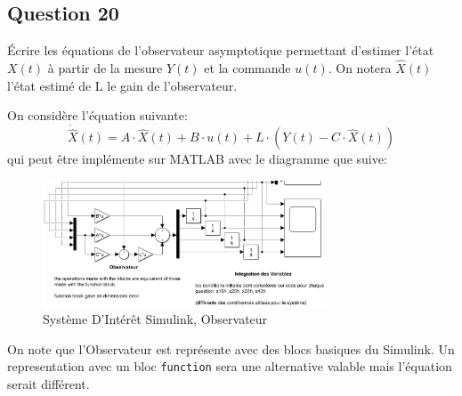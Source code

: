 \documentclass[class=article, crop=false]{standalone}
\begin{document}
\newpage
\subsection{Question 20}
\begin{exercise}
    Écrire les équations de l'observateur asymptotique permettant d'estimer l'état $X(t)$ à partir de la mesure $Y(t)$ et la commande $u(t)$. On notera $\hat{X}(t)$ l'état estimé de L le gain de l'observateur.
\end{exercise}
\begin{resolution}
    On considère l'équation suivante:
    \begin{equation}
        \dot{\hat{X}}(t) = A \cdot \hat{X}(t) + B \cdot u(t) + L \cdot (Y(t) - C \cdot \hat{X}(t))
    \end{equation}
    qui peut être implémente sur MATLAB avec le diagramme que suive:
    \begin{figure}[H]
        \centering
        \includegraphics[width=0.75\textwidth]{../images/system_simulink_40.png}
        \caption{Système D'Intérêt Simulink, Observateur}
    \end{figure}
    On note que l'Observateur est représente avec des blocs basiques du Simulink. Un representation avec un bloc \texttt{function} sera une alternative valable mais l'équation serait différent.
\end{resolution}

\newpage
\end{document}
